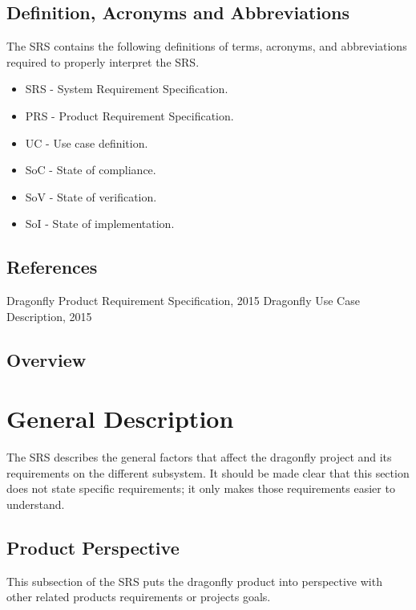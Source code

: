 \documentclass[a4paper]{article}
\begin{document}
\subsection{Definition, Acronyms and Abbreviations}

The SRS contains the following definitions of terms, acronyms, and abbreviations required to properly interpret the SRS.
\begin{itemize}
	\item SRS - System Requirement Specification.
	\item PRS - Product Requirement Specification. 
	\item UC  - Use case definition.
	\item SoC - State of compliance.
	\item SoV - State of verification.
	\item SoI - State of implementation.
\end{itemize}

\subsection{References}

\begin{thebibliography}{99}
	 Dragonfly Product Requirement Specification, 2015
	 Dragonfly Use Case Description, 2015
\end{thebibliography}

\subsection{Overview}

\section{General Description}

The SRS describes the general factors that affect the dragonfly project and its requirements on the different subsystem. It should be made clear that this section does not state specific requirements; it only makes those requirements easier to understand.

\subsection{Product Perspective}

This subsection of the SRS puts the dragonfly product into perspective with other related products requirements or projects goals. 
\end{document}
